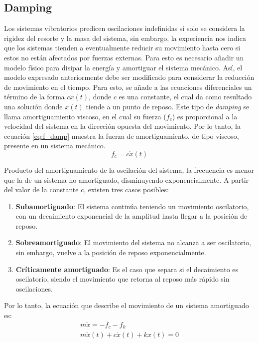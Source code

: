 \subsection{Damping}
\label{sec:damping}
Los sistemas vibratorios predicen oscilaciones indefinidas si solo se considera la rigidez del resorte y la masa del sistema, sin embargo, la experiencia nos indica que los sistemas tienden a eventualmente reducir su movimiento hasta cero si estos no están afectados por fuerzas externas. Para esto es necesario añadir un modelo físico para disipar la energía y amortiguar el sistema mecánico. Así, el modelo expresado anteriormente debe ser modificado para considerar la reducción de movimiento en el tiempo. Para esto, se añade a las ecuaciones diferenciales un término de la forma $c\dot{x}(t)$, donde $c$ es una constante, el cual da como resultado una solución donde $x(t)$ tiende a un punto de reposo. Este tipo de \textit{damping} se llama amortiguamiento viscoso, en el cual su fuerza ($f_c$) es proporcional a la velocidad del sistema en la dirección opuesta del movimiento. Por lo tanto, la ecuación \ref{eq:f_damp} muestra la fuerza de amortiguamiento, de tipo viscoso, presente en un sistema mecánico.
\begin{equation}\label{eq:f_damp}
	f_c = c\dot{x}(t)
\end{equation}

Producto del amortiguamiento de la oscilación del sistema, la frecuencia es menor que la de un sistema no amortiguado, disminuyendo exponencialmente. A partir del valor de la constante $c$, existen tres casos posibles:
\begin{enumerate}
	\item \textbf{Subamortiguado}: El sistema continúa teniendo un movimiento oscilatorio, con un decaimiento exponencial de la amplitud hasta llegar a la posición de reposo.
	\item \textbf{Sobreamortiguado}: El movimiento del sistema no alcanza a ser oscilatorio, sin embargo, vuelve a la posición de reposo exponencialmente.
	\item \textbf{Críticamente amortiguado}: Es el caso que separa si el decaimiento es oscilatorio, siendo el movimiento que retorna al reposo más rápido sin oscilaciones.
\end{enumerate}

Por lo tanto, la ecuación que describe el movimiento de un sistema amortiguado es:
\begin{gather*}
	m\ddot{x} = -f_c - f_k \\
	m\ddot{x}(t) + c\dot{x}(t) + kx(t) = 0 
\end{gather*}

